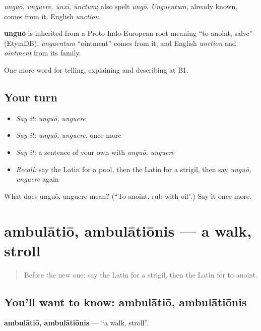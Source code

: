 \emph{unguō, unguere, ūnxī, ūnctum}; also spelt \emph{ungō}. \emph{Unguentum}, already known, comes from it. English \emph{unction}.

\begin{cousinweb}
\textbf{unguō} is inherited from a Proto-Indo-European root meaning \textquotedblleft{}to anoint, salve\textquotedblright{} (EtymDB). \emph{unguentum} \textquotedblleft{}ointment\textquotedblright{} comes from it, and English \emph{unction} and \emph{ointment} from its family.
\end{cousinweb}

\begin{grammarlens}[title={What you've built}]
One more word for telling, explaining and describing at B1.
\end{grammarlens}

\subsection*{Your turn}
\begin{itemize}
\raggedright
  \item \emph{Say it:} \emph{unguō, unguere}
  \item \emph{Say it:} \emph{unguō, unguere}, once more
  \item \emph{Say it:} a sentence of your own with \emph{unguō, unguere}
  \item \emph{Recall:} say the Latin for a pool, then the Latin for a strigil, then say \emph{unguō, unguere} again
\end{itemize}

\begin{tcolorbox}[breakable,colback=teal!4,colframe=teal!35!black,title={Before you move on}]
What does unguō, unguere mean? (\textquotedblleft{}To anoint, rub with oil\textquotedblright{}.) Say it once more.
\end{tcolorbox}
\section[ambulātiō, ambulātiōnis]{ambulātiō, ambulātiōnis — a walk, stroll}

\label{lesson:LA-C542-ambulatio}



\begin{quote}
Before the new one: say the Latin for a strigil, then the Latin for to anoint.
\end{quote}

\subsection*{You'll want to know: ambulātiō, ambulātiōnis}
\textbf{ambulātiō, ambulātiōnis} — \textquotedblleft{}a walk, stroll\textquotedblright{}.

